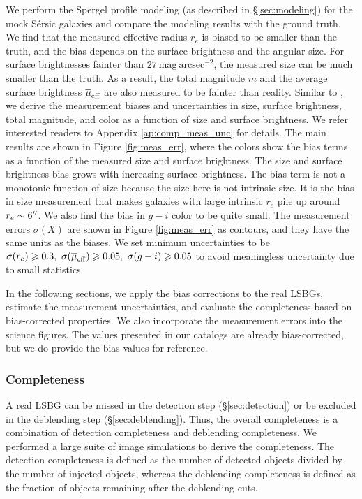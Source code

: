\documentclass[twocolumn,astrosymb,twocolappendix]{aastex631}
\newcommand{\sbunit}{\mathrm{mag\ arcsec}^{-2}}
\newcommand{\sersic}{S\'ersic}
\begin{document}
\begin{CJK*}{UTF8}{gbsn}
We perform the Spergel profile modeling (as described in \S\ref{sec:modeling}) for the mock \sersic{} galaxies and compare the modeling results with the ground truth. We find that the measured effective radius $r_e$ is biased to be smaller than the truth, and the bias depends on the surface brightness and the angular size. For surface brightnesses fainter than $27\ \sbunit$, the measured size can be much smaller than the truth. As a result, the total magnitude $m$ and the average surface brightness $\overline{\mu}_{\rm eff}$ are also measured to be fainter than reality. Similar to \citet{Zaritsky2021}, we derive the measurement biases and uncertainties in size, surface brightness, total magnitude, and color as a function of size and surface brightness. We refer interested readers to Appendix \ref{ap:comp_meas_unc} for details. The main results are shown in Figure \ref{fig:meas_err}, where the colors show the bias terms as a function of the measured size and surface brightness. The size and surface brightness bias grows with increasing surface brightness. The bias term is not a monotonic function of size because the size here is not intrinsic size. It is the bias in size measurement that makes galaxies with large intrinsic $r_e$ pile up around $r_e\sim 6\mbox{$^{\prime\prime}$}$. We also find the bias in $g-i$ color to be quite small. The measurement errors $\sigma(X)$ are shown in Figure \ref{fig:meas_err} as contours, and they have the same units as the biases. We set minimum uncertainties to be $\sigma(r_e) \geqslant 0.3,\ \sigma(\overline{\mu}_{\rm eff}) \geqslant 0.05,\ \sigma(g-i) \geqslant 0.05$ to avoid meaningless uncertainty due to small statistics. 

In the following sections, we apply the bias corrections to the real LSBGs, estimate the measurement uncertainties, and evaluate the completeness based on bias-corrected properties. We also incorporate the measurement errors into the science figures. The values presented in our catalogs are already bias-corrected, but we do provide the bias values for reference. 



\subsubsection{Completeness}\label{sec:completeness}
A real LSBG can be missed in the detection step (\S \ref{sec:detection}) or be excluded in the deblending step (\S \ref{sec:deblending}). Thus, the overall completeness is a combination of detection completeness and deblending completeness. We performed a large suite of image simulations to derive the completeness. The detection completeness is defined as the number of detected objects divided by the number of injected objects, whereas the deblending completeness is defined as the fraction of objects remaining after the deblending cuts. 


\end{CJK*}
\end{document}
